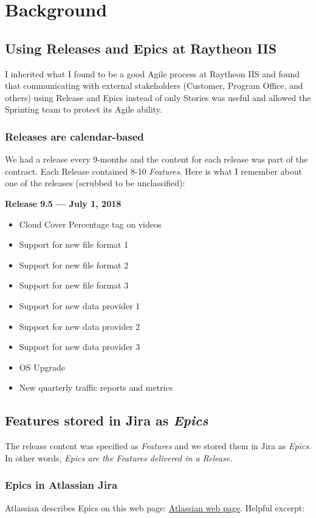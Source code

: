 \documentclass[letterpaper,11pt]{texMemo} %
\begin{document}
\newpage
\section*{Background}
\subsection*{Using Releases and Epics at Raytheon IIS}

I inherited what I found to be a good Agile process at Raytheon IIS and found that communicating with external stakeholders (Customer, Program Office, and others) using Release and Epics instead of only Stories was useful and allowed the Sprinting team to protect its Agile ability.

\subsubsection*{Releases are calendar-based}
We had a release every 9-months and the content for each release was part of the contract. Each Release contained 8-10 \emph{Features}.  Here is what I remember about one of the releases (scrubbed to be unclassified):

\textbf{Release 9.5 --- July 1, 2018}
\begin{itemize}
[noitemsep]
\item Cloud Cover Percentage tag on videos
\item Support for new file format 1
\item Support for new file format 2
\item Support for new file format 3
\item Support for new data provider 1
\item Support for new data provider 2
\item Support for new data provider 3
\item OS Upgrade
\item New quarterly traffic reports and metrics
\end{itemize}

\subsection*{Features stored in Jira as \emph{Epics}}

The release content was specified as \emph{Features} and we stored them in Jira as \emph{Epics}.
In other words, \emph{Epics are the Features delivered in a Release}.

\subsubsection*{Epics in Atlassian Jira}
Atlassian describes Epics on this web page: \href{https://www.atlassian.com/agile/project-management/epics}{Atlassian web page}. Helpful excerpt:
\end{document}
